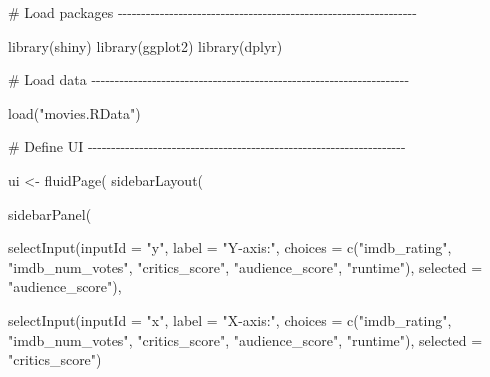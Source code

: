 \documentclass[
  letterpaper,
  DIV=11,
  numbers=noendperiod]{scrreprt}
\newenvironment{Shaded}{\begin{snugshade}}{\end{snugshade}}
\newcommand{\AttributeTok}[1]{\textcolor[rgb]{0.40,0.46,0.14}{#1}}
\newcommand{\CommentTok}[1]{\textcolor[rgb]{0.37,0.37,0.37}{#1}}
\newcommand{\FunctionTok}[1]{\textcolor[rgb]{0.28,0.35,0.67}{#1}}
\newcommand{\NormalTok}[1]{\textcolor[rgb]{0.00,0.46,0.62}{#1}}
\newcommand{\OtherTok}[1]{\textcolor[rgb]{0.00,0.46,0.62}{#1}}
\newcommand{\StringTok}[1]{\textcolor[rgb]{0.13,0.47,0.30}{#1}}
\begin{document}
\begin{Shaded}
\begin{Highlighting}[]
\CommentTok{\# Load packages {-}{-}{-}{-}{-}{-}{-}{-}{-}{-}{-}{-}{-}{-}{-}{-}{-}{-}{-}{-}{-}{-}{-}{-}{-}{-}{-}{-}{-}{-}{-}{-}{-}{-}{-}{-}{-}{-}{-}{-}{-}{-}{-}{-}{-}{-}{-}{-}{-}{-}{-}{-}{-}{-}{-}{-}{-}{-}{-}{-}{-}{-}{-}{-}}

\FunctionTok{library}\NormalTok{(shiny)}
\FunctionTok{library}\NormalTok{(ggplot2)}
\FunctionTok{library}\NormalTok{(dplyr)}

\CommentTok{\# Load data {-}{-}{-}{-}{-}{-}{-}{-}{-}{-}{-}{-}{-}{-}{-}{-}{-}{-}{-}{-}{-}{-}{-}{-}{-}{-}{-}{-}{-}{-}{-}{-}{-}{-}{-}{-}{-}{-}{-}{-}{-}{-}{-}{-}{-}{-}{-}{-}{-}{-}{-}{-}{-}{-}{-}{-}{-}{-}{-}{-}{-}{-}{-}{-}{-}{-}{-}{-}}

\FunctionTok{load}\NormalTok{(}\StringTok{"movies.RData"}\NormalTok{)}

\CommentTok{\# Define UI {-}{-}{-}{-}{-}{-}{-}{-}{-}{-}{-}{-}{-}{-}{-}{-}{-}{-}{-}{-}{-}{-}{-}{-}{-}{-}{-}{-}{-}{-}{-}{-}{-}{-}{-}{-}{-}{-}{-}{-}{-}{-}{-}{-}{-}{-}{-}{-}{-}{-}{-}{-}{-}{-}{-}{-}{-}{-}{-}{-}{-}{-}{-}{-}{-}{-}{-}{-}}

\NormalTok{ui }\OtherTok{\textless{}{-}} \FunctionTok{fluidPage}\NormalTok{(}
  \FunctionTok{sidebarLayout}\NormalTok{(}
    
    \FunctionTok{sidebarPanel}\NormalTok{(}
      
      \FunctionTok{selectInput}\NormalTok{(}\AttributeTok{inputId =} \StringTok{"y"}\NormalTok{,}
                  \AttributeTok{label =} \StringTok{"Y{-}axis:"}\NormalTok{,}
                  \AttributeTok{choices =} \FunctionTok{c}\NormalTok{(}\StringTok{"imdb\_rating"}\NormalTok{, }\StringTok{"imdb\_num\_votes"}\NormalTok{, }\StringTok{"critics\_score"}\NormalTok{, }\StringTok{"audience\_score"}\NormalTok{, }\StringTok{"runtime"}\NormalTok{),}
                  \AttributeTok{selected =} \StringTok{"audience\_score"}\NormalTok{),}
      
      \FunctionTok{selectInput}\NormalTok{(}\AttributeTok{inputId =} \StringTok{"x"}\NormalTok{,}
                  \AttributeTok{label =} \StringTok{"X{-}axis:"}\NormalTok{,}
                  \AttributeTok{choices =} \FunctionTok{c}\NormalTok{(}\StringTok{"imdb\_rating"}\NormalTok{, }\StringTok{"imdb\_num\_votes"}\NormalTok{, }\StringTok{"critics\_score"}\NormalTok{, }\StringTok{"audience\_score"}\NormalTok{, }\StringTok{"runtime"}\NormalTok{),}
                  \AttributeTok{selected =} \StringTok{"critics\_score"}\NormalTok{)}
      

\end{Highlighting}
\end{Shaded}
\end{document}
